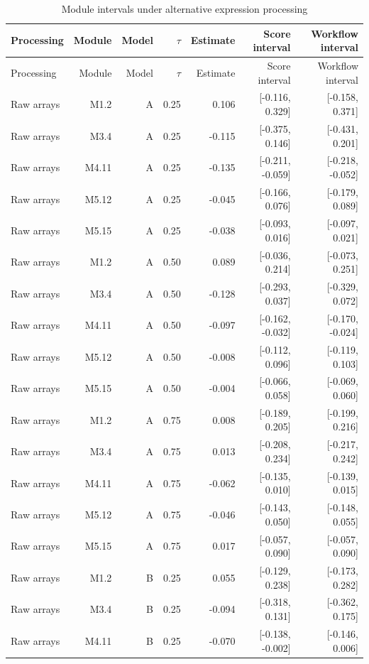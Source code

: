 \begin{longtable}{lrrrrrr}
\caption{Module intervals under alternative expression processing}\label{tab:joint-processing-modules}\\
\toprule
Processing & Module & Model & $\tau$ & Estimate & Score interval & Workflow interval \\
\midrule\endfirsthead
\toprule
Processing & Module & Model & $\tau$ & Estimate & Score interval & Workflow interval \\
\midrule\endhead
Raw arrays & M1.2 & A & 0.25 & 0.106 & [-0.116, 0.329] & [-0.158, 0.371] \\
Raw arrays & M3.4 & A & 0.25 & -0.115 & [-0.375, 0.146] & [-0.431, 0.201] \\
Raw arrays & M4.11 & A & 0.25 & -0.135 & [-0.211, -0.059] & [-0.218, -0.052] \\
Raw arrays & M5.12 & A & 0.25 & -0.045 & [-0.166, 0.076] & [-0.179, 0.089] \\
Raw arrays & M5.15 & A & 0.25 & -0.038 & [-0.093, 0.016] & [-0.097, 0.021] \\
Raw arrays & M1.2 & A & 0.50 & 0.089 & [-0.036, 0.214] & [-0.073, 0.251] \\
Raw arrays & M3.4 & A & 0.50 & -0.128 & [-0.293, 0.037] & [-0.329, 0.072] \\
Raw arrays & M4.11 & A & 0.50 & -0.097 & [-0.162, -0.032] & [-0.170, -0.024] \\
Raw arrays & M5.12 & A & 0.50 & -0.008 & [-0.112, 0.096] & [-0.119, 0.103] \\
Raw arrays & M5.15 & A & 0.50 & -0.004 & [-0.066, 0.058] & [-0.069, 0.060] \\
Raw arrays & M1.2 & A & 0.75 & 0.008 & [-0.189, 0.205] & [-0.199, 0.216] \\
Raw arrays & M3.4 & A & 0.75 & 0.013 & [-0.208, 0.234] & [-0.217, 0.242] \\
Raw arrays & M4.11 & A & 0.75 & -0.062 & [-0.135, 0.010] & [-0.139, 0.015] \\
Raw arrays & M5.12 & A & 0.75 & -0.046 & [-0.143, 0.050] & [-0.148, 0.055] \\
Raw arrays & M5.15 & A & 0.75 & 0.017 & [-0.057, 0.090] & [-0.057, 0.090] \\
Raw arrays & M1.2 & B & 0.25 & 0.055 & [-0.129, 0.238] & [-0.173, 0.282] \\
Raw arrays & M3.4 & B & 0.25 & -0.094 & [-0.318, 0.131] & [-0.362, 0.175] \\
Raw arrays & M4.11 & B & 0.25 & -0.070 & [-0.138, -0.002] & [-0.146, 0.006] \\

\end{longtable}
